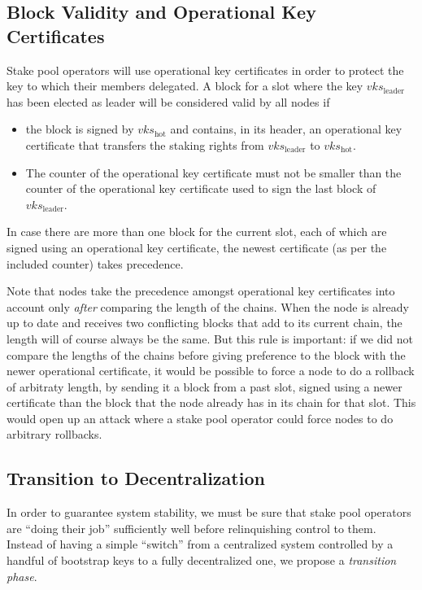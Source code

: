 \documentclass[11pt,a4paper]{article}
\begin{document}
\subsection{Block Validity and Operational Key Certificates}
\label{block-validity-and-operational-key-certificates}

Stake pool operators will use operational key certificates in order to protect
the key to which their members delegated. A block for a slot where the key
\(vks_\text{leader}\) has been elected as leader will be considered valid by all
nodes if

\begin{itemize}
\item
  the block is signed by \(vks_\text{hot}\) and contains, in its header, an
  operational key certificate that transfers the staking rights from
  \(vks_\text{leader}\) to \(vks_\text{hot}\).

\item
  The counter of the operational key certificate must not be smaller than the
  counter of the operational key certificate used to sign the last block of
  \(vks_\text{leader}\).
\end{itemize}

In case there are more than one block for the current slot, each of
which are signed using an operational key certificate, the newest certificate
(as per the included counter) takes precedence.

Note that nodes take the precedence amongst operational key certificates into
account only \emph{after} comparing the length of the chains. When the node is
already up to date and receives two conflicting blocks that add to its current
chain, the length will of course always be the same. But this rule is important:
if we did not compare the lengths of the chains before giving preference to the
block with the newer operational certificate, it would be possible to force a
node to do a rollback of arbitraty length, by sending it a block from a past
slot, signed using a newer certificate than the block that the node already has
in its chain for that slot. This would open up an attack where a stake pool
operator could force nodes to do arbitrary rollbacks.

\subsection{Transition to Decentralization}
\label{transition-to-decentralization}

In order to guarantee system stability, we must be sure that stake pool
operators are ``doing their job'' sufficiently well before relinquishing
control to them. Instead of having a simple ``switch'' from a
centralized system controlled by a handful of bootstrap keys to a fully
decentralized one, we propose a \emph{transition phase}.
\end{document}
